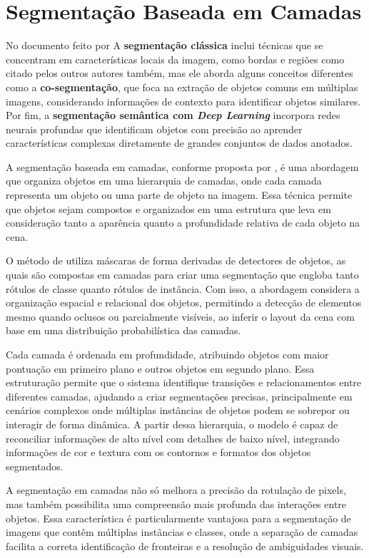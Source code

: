 \section{Segmentação Baseada em Camadas}

No documento feito por  A \textbf{segmentação clássica} inclui técnicas que se concentram em características locais da imagem, como bordas e regiões como citado pelos outros autores também, mas ele aborda alguns conceitos diferentes como a \textbf{co-segmentação}, que foca na extração de objetos comuns em múltiplas imagens, considerando informações de contexto para identificar objetos similares. Por fim, a \textbf{segmentação semântica com \textit{Deep Learning}} incorpora redes neurais profundas que identificam objetos com precisão ao aprender características complexas diretamente de grandes conjuntos de dados anotados.

A segmentação baseada em camadas, conforme proposta por , é uma abordagem que organiza objetos em uma hierarquia de camadas, onde cada camada representa um objeto ou uma parte de objeto na imagem. Essa técnica permite que objetos sejam compostos e organizados em uma estrutura que leva em consideração tanto a aparência quanto a profundidade relativa de cada objeto na cena.

O método de  utiliza máscaras de forma derivadas de detectores de objetos, as quais são compostas em camadas para criar uma segmentação que engloba tanto rótulos de classe quanto rótulos de instância. Com isso, a abordagem considera a organização espacial e relacional dos objetos, permitindo a detecção de elementos mesmo quando oclusos ou parcialmente visíveis, ao inferir o layout da cena com base em uma distribuição probabilística das camadas.

Cada camada é ordenada em profundidade, atribuindo objetos com maior pontuação em primeiro plano e outros objetos em segundo plano. Essa estruturação permite que o sistema identifique transições e relacionamentos entre diferentes camadas, ajudando a criar segmentações precisas, principalmente em cenários complexos onde múltiplas instâncias de objetos podem se sobrepor ou interagir de forma dinâmica. A partir dessa hierarquia, o modelo é capaz de reconciliar informações de alto nível com detalhes de baixo nível, integrando informações de cor e textura com os contornos e formatos dos objetos segmentados.

A segmentação em camadas não só melhora a precisão da rotulação de pixels, mas também possibilita uma compreensão mais profunda das interações entre objetos. Essa característica é particularmente vantajosa para a segmentação de imagens que contêm múltiplas instâncias e classes, onde a separação de camadas facilita a correta identificação de fronteiras e a resolução de ambiguidades visuais.

